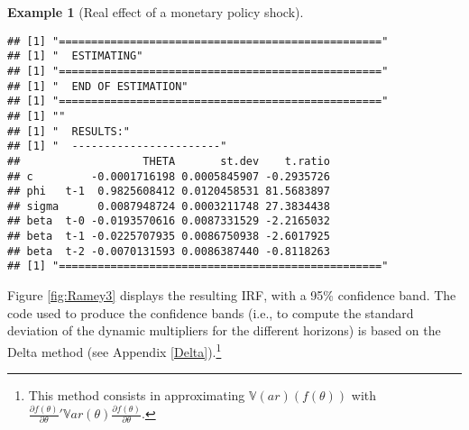 \documentclass[
  12pt,
]{book}
\newenvironment{Shaded}{\begin{snugshade}}{\end{snugshade}}
\newcommand{\AttributeTok}[1]{\textcolor[rgb]{0.77,0.63,0.00}{#1}}
\newcommand{\CommentTok}[1]{\textcolor[rgb]{0.56,0.35,0.01}{\textit{#1}}}
\newcommand{\ConstantTok}[1]{\textcolor[rgb]{0.00,0.00,0.00}{#1}}
\newcommand{\DecValTok}[1]{\textcolor[rgb]{0.00,0.00,0.81}{#1}}
\newcommand{\FunctionTok}[1]{\textcolor[rgb]{0.00,0.00,0.00}{#1}}
\newcommand{\NormalTok}[1]{#1}
\newcommand{\OtherTok}[1]{\textcolor[rgb]{0.56,0.35,0.01}{#1}}
\newcommand{\SpecialCharTok}[1]{\textcolor[rgb]{0.00,0.00,0.00}{#1}}
\theoremstyle{definition}
\theoremstyle{definition}
\newtheorem{example}{Example}[chapter]
\theoremstyle{definition}
\theoremstyle{definition}
\theoremstyle{remark}
\begin{document}
\begin{example}[Real effect of a monetary policy shock]
\begin{Shaded}
\end{Shaded}

\begin{verbatim}
## [1] "=================================================="
## [1] "  ESTIMATING"
## [1] "=================================================="
## [1] "  END OF ESTIMATION"
## [1] "=================================================="
## [1] ""
## [1] "  RESULTS:"
## [1] "  -----------------------"
##                   THETA       st.dev    t.ratio
## c         -0.0001716198 0.0005845907 -0.2935726
## phi   t-1  0.9825608412 0.0120458531 81.5683897
## sigma      0.0087948724 0.0003211748 27.3834438
## beta  t-0 -0.0193570616 0.0087331529 -2.2165032
## beta  t-1 -0.0225707935 0.0086750938 -2.6017925
## beta  t-2 -0.0070131593 0.0086387440 -0.8118263
## [1] "=================================================="
\end{verbatim}

\begin{Shaded}
\end{Shaded}

Figure \ref{fig:Ramey3} displays the resulting IRF, with a 95\% confidence band. The code used to produce the confidence bands (i.e., to compute the standard deviation of the dynamic multipliers for the different horizons) is based on the Delta method (see Appendix \ref{Delta}).\footnote{This method consists in approximating \(\mathbb{V}(ar)(f(\theta))\) with \(\frac{\partial f(\theta)}{\partial \theta}' \mathbb{V}ar(\theta)\frac{\partial f(\theta)}{\partial \theta}\).}


\end{example}
\end{document}
